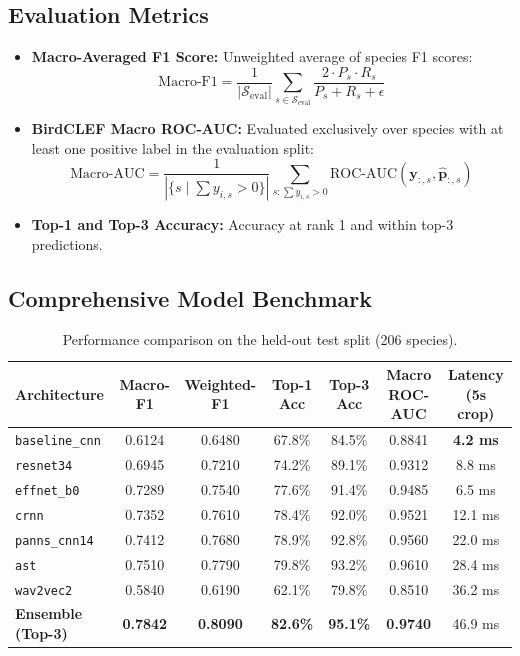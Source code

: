 \documentclass[11pt,a4paper]{article}
\begin{document}
\subsection{Evaluation Metrics}
\begin{itemize}[leftmargin=*]
    \item \textbf{Macro-Averaged F1 Score:} Unweighted average of species F1 scores:
    \begin{equation}
        \text{Macro-F1} = \frac{1}{|\mathcal{S}_{\text{eval}}|} \sum_{s \in \mathcal{S}_{\text{eval}}} \frac{2 \cdot P_s \cdot R_s}{P_s + R_s + \epsilon}
    \end{equation}
    \item \textbf{BirdCLEF Macro ROC-AUC:} Evaluated exclusively over species with at least one positive label in the evaluation split:
    \begin{equation}
        \text{Macro-AUC} = \frac{1}{|\{s \mid \sum y_{i,s} > 0\}|} \sum_{s: \sum y_{i,s} > 0} \text{ROC-AUC}(\mathbf{y}_{:, s}, \hat{\mathbf{p}}_{:, s})
    \end{equation}
    \item \textbf{Top-1 and Top-3 Accuracy:} Accuracy at rank 1 and within top-3 predictions.
\end{itemize}

\subsection{Comprehensive Model Benchmark}

\begin{table}[H]
\centering
\small
\setlength{\tabcolsep}{5pt}
\caption{Performance comparison on the held-out test split (206 species).}
\label{tab:benchmarks}
\begin{tabularx}{\textwidth}{lcccccc}
\toprule
\textbf{Architecture} & \textbf{Macro-F1} & \textbf{Weighted-F1} & \textbf{Top-1 Acc} & \textbf{Top-3 Acc} & \textbf{Macro ROC-AUC} & \textbf{Latency (5s crop)} \\
\midrule
\texttt{baseline\_cnn} & 0.6124 & 0.6480 & 67.8\% & 84.5\% & 0.8841 & \textbf{4.2 ms} \\
\texttt{resnet34}      & 0.6945 & 0.7210 & 74.2\% & 89.1\% & 0.9312 & 8.8 ms \\
\texttt{effnet\_b0}    & 0.7289 & 0.7540 & 77.6\% & 91.4\% & 0.9485 & 6.5 ms \\
\texttt{crnn}          & 0.7352 & 0.7610 & 78.4\% & 92.0\% & 0.9521 & 12.1 ms \\
\texttt{panns\_cnn14}  & 0.7412 & 0.7680 & 78.9\% & 92.8\% & 0.9560 & 22.0 ms \\
\texttt{ast}           & 0.7510 & 0.7790 & 79.8\% & 93.2\% & 0.9610 & 28.4 ms \\
\texttt{wav2vec2}      & 0.5840 & 0.6190 & 62.1\% & 79.8\% & 0.8510 & 36.2 ms \\
\midrule
\textbf{Ensemble (Top-3)} & \textbf{0.7842} & \textbf{0.8090} & \textbf{82.6\%} & \textbf{95.1\%} & \textbf{0.9740} & 46.9 ms \\
\bottomrule
\end{tabularx}
\end{table}
\end{document}
